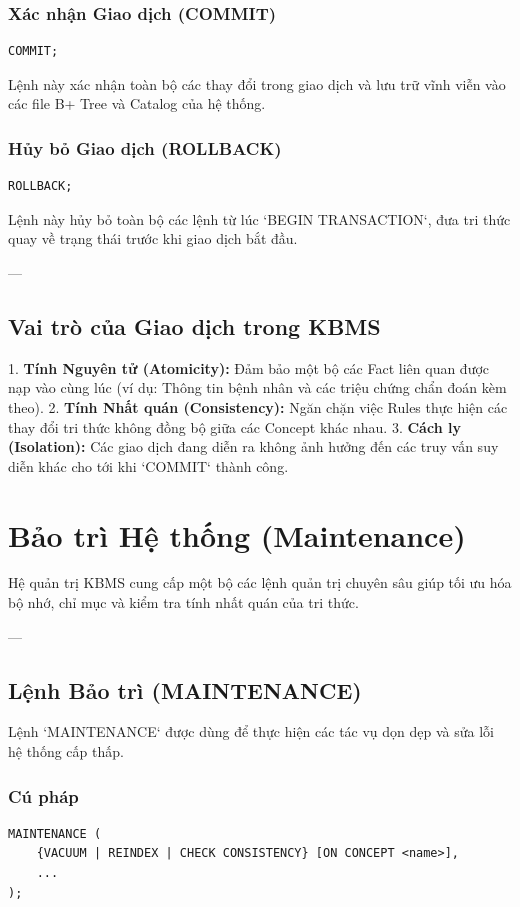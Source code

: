 \subsubsection{Xác nhận Giao dịch (COMMIT)}
\begin{verbatim}
COMMIT;
\end{verbatim}
Lệnh này xác nhận toàn bộ các thay đổi trong giao dịch và lưu trữ vĩnh viễn vào các file B+ Tree và Catalog của hệ thống.

\subsubsection{Hủy bỏ Giao dịch (ROLLBACK)}
\begin{verbatim}
ROLLBACK;
\end{verbatim}
Lệnh này hủy bỏ toàn bộ các lệnh từ lúc `BEGIN TRANSACTION`, đưa tri thức quay về trạng thái trước khi giao dịch bắt đầu.

---

\subsection{Vai trò của Giao dịch trong KBMS}

1.  \textbf{Tính Nguyên tử (Atomicity):} Đảm bảo một bộ các Fact liên quan được nạp vào cùng lúc (ví dụ: Thông tin bệnh nhân và các triệu chứng chẩn đoán kèm theo).
2.  \textbf{Tính Nhất quán (Consistency):} Ngăn chặn việc Rules thực hiện các thay đổi tri thức không đồng bộ giữa các Concept khác nhau.
3.  \textbf{Cách ly (Isolation):} Các giao dịch đang diễn ra không ảnh hưởng đến các truy vấn suy diễn khác cho tới khi `COMMIT` thành công.

\section{Bảo trì Hệ thống (Maintenance)}

Hệ quản trị KBMS cung cấp một bộ các lệnh quản trị chuyên sâu giúp tối ưu hóa bộ nhớ, chỉ mục và kiểm tra tính nhất quán của tri thức.

---

\subsection{Lệnh Bảo trì (MAINTENANCE)}

Lệnh `MAINTENANCE` được dùng để thực hiện các tác vụ dọn dẹp và sửa lỗi hệ thống cấp thấp.

\subsubsection{Cú pháp}
\begin{verbatim}
MAINTENANCE (
    {VACUUM | REINDEX | CHECK CONSISTENCY} [ON CONCEPT <name>],
    ...
);
\end{verbatim}

